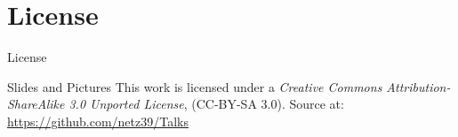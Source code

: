 \documentclass{beamer}
\begin{document}
\appendix

\section{License}

\begin{frame}{License}
    \begin{block}{Slides and Pictures}
        This work is licensed under a \emph{Creative Commons
        Attribution-ShareAlike 3.0 Unported License}, (CC-BY-SA 3.0).
        Source at: \url{https://github.com/netz39/Talks}
    \end{block}
\end{frame}
\end{document}
